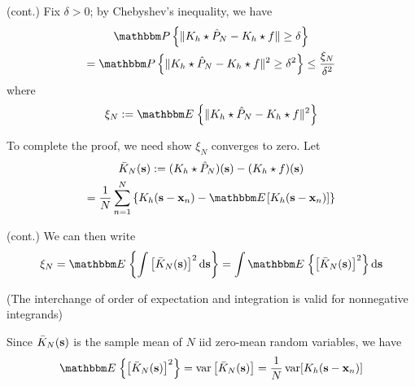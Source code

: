 \begin{frame}

    \vspace{2em}
    \Prf (cont.)
    Fix $\delta >
    0$; by Chebyshev's inequality, we have
    \begin{multline*}
        \PP \left\{ 
            \| K_h \star \hat P_N - K_h \star f \| \geq \delta 
            \right\} 
        \\ = \PP \left\{ 
            \| K_h \star \hat P_N - K_h \star f \|^2 \geq \delta^2 
              \right\} 
        \leq \frac{\xi_N}{\delta^2}
    \end{multline*}
    where
    \begin{equation*}
        \xi_N := 
            \EE \left\{
                \| K_h \star \hat P_N - K_h \star f \|^2
            \right\}
    \end{equation*}
    
    \vspace{.7em}
    To complete the proof,  we need show $\xi_N$
    converges to zero. Let 
    \begin{multline*}
        \bar K_N (\bolds)
         := (K_h \star \hat P_N)(\bolds) - (K_h \star f)(\bolds) 
         \\ = \frac{1}{N} \sum_{n=1}^N
             \left\{
             K_h(\bolds - \boldx_n) - \EE [ K_h(\bolds - \boldx_n) ]
             \right\}
    \end{multline*}
    
    \end{frame}
    \begin{frame}
    \Prf (cont.)
    We can then write
    \begin{equation}
        \label{eq:hktz}
        \xi_N
        =
        \EE \left\{ 
            \int \left[ \bar K_N(\bolds) \right]^2 
            \diff \bolds
            \right\}
        =
        \int 
        \EE \left\{ \left[ \bar K_N(\bolds) \right]^2 \right\}
            \diff \bolds
    \end{equation}
    
    \vspace{.7em}
    (The interchange of order of expectation and integration
    is valid for nonnegative integrands)
    
    \vspace{.7em}
    Since $\bar K_N ({\mathbf s})$ is the sample mean of $N$
    {\sc iid} zero-mean random variables, we have
    \begin{equation*}
        \EE \left\{ \left[ \bar K_N(\bolds) \right]^2 \right\}
        = \var  \left[ \bar K_N(\bolds) \right]
        = \frac{1}{N} \var[ K_h(\bolds - \boldx_n) ]
    \end{equation*}

\end{frame}


